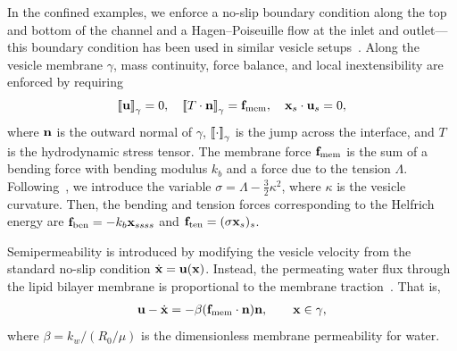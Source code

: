 \documentclass[prb,preprint,showpacs,preprintnumbers,amsmath,amssymb,longbibliography]{revtex4-1}
\begin{document}
In the confined examples, we enforce a
no-slip boundary condition along the top and bottom of the channel and a
Hagen–Poiseuille flow at the inlet and outlet---this boundary condition
has been used in similar vesicle setups~\cite{qua-bir2014,
rah-vee-bir2010, lu-rah-zor2017}. Along the vesicle membrane $\gamma$,
mass continuity, force balance, and local inextensibility are enforced
by requiring
\begin{align}
  \label{eqn:jump}
  \left[\!\left[ \mathbf{u} \right]\!\right]_\gamma = 0, \quad
  \left[\!\left[ T\cdot\mathbf{n} \right]\!\right]_\gamma = \mathbf{f}_\mathrm{mem}, \quad
  \mathbf{x}_s \cdot \mathbf{u}_s = 0,
\end{align}
where $\mathbf{n}$ is the outward normal of $\gamma$, $\left[\!\left[ \cdot \right]\!\right]_\gamma$ is the
jump across the interface, and $T$ is the hydrodynamic stress tensor.
The membrane force $\mathbf{f}_\mathrm{mem}$ is the sum of a bending force
with bending modulus $k_b$ and a force due to the tension $\Lambda$.
Following~\cite{vee-gue-zor-bir2009}, we introduce the variable $\sigma
= \Lambda - \frac{3}{2}\kappa^2$, where $\kappa$ is the vesicle curvature. Then,
the bending and tension forces corresponding to the Helfrich energy are
$\mathbf{f}_\mathrm{ben} = -k_b \mathbf{x}_{ssss}$ and $\mathbf{f}_\mathrm{ten} = (\sigma
\mathbf{x}_s)_s$. 

Semipermeability is introduced by modifying the vesicle velocity from
the standard no-slip condition $\dot{\mathbf{x}} = \mathbf{u}(\mathbf{x})$. Instead,
the permeating water flux through the lipid bilayer membrane is proportional to the
membrane traction~\cite{yao-mor2017}. That is, 
\begin{align}
  \label{eqn:vesicleFlux}
  \mathbf{u} - \dot{\mathbf{x}} = - \beta (\mathbf{f}_\mathrm{mem} \cdot \mathbf{n}) \mathbf{n}, \qquad
  \mathbf{x} \in \gamma,
\end{align}
where $\beta = k_w/(R_0/\mu)$ is the dimensionless membrane permeability for water.

\end{document}
